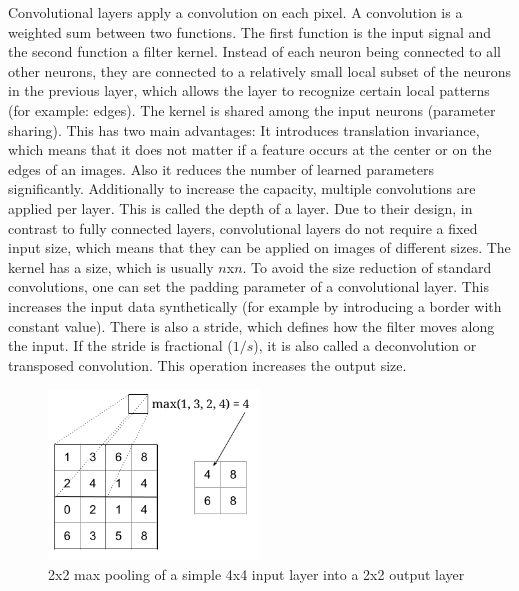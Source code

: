 \documentclass[draft,final,oneside]{vutinfth} %
\begin{document}
Convolutional layers apply a convolution on each pixel. A convolution is a weighted sum between two functions. The first function is the input signal and the second function a filter kernel. Instead of each neuron being connected to all other neurons, they are connected to a relatively small local subset of the neurons in the previous layer, which allows the layer to recognize certain local patterns (for example: edges). The kernel is shared among the input neurons (parameter sharing). This has two main advantages: It introduces translation invariance, which means that it does not matter if a feature occurs at the center or on the edges of an images. Also it reduces the number of learned parameters significantly. Additionally to increase the capacity, multiple convolutions are applied per layer. This is called the depth of a layer. Due to their design, in contrast to fully connected layers, convolutional layers do not require a fixed input size, which means that they can be applied on images of different sizes. The kernel has a size, which is usually $n$x$n$. To avoid the size reduction of standard convolutions, one can set the padding parameter of a convolutional layer. This increases the input data synthetically (for example by introducing a border with constant value). There is also a stride, which defines how the filter moves along the input. If the stride is fractional ($1/s$), it is also called a deconvolution or transposed convolution. This operation increases the output size.


\begin{figure}[ht]
	\centering
  	\includegraphics[width=0.5\textwidth]{graphics/maxpooling.png}
	\caption{2x2 max pooling of a simple 4x4 input layer into a 2x2 output layer}
	\label{fig:maxpooling}
\end{figure}
\end{document}
